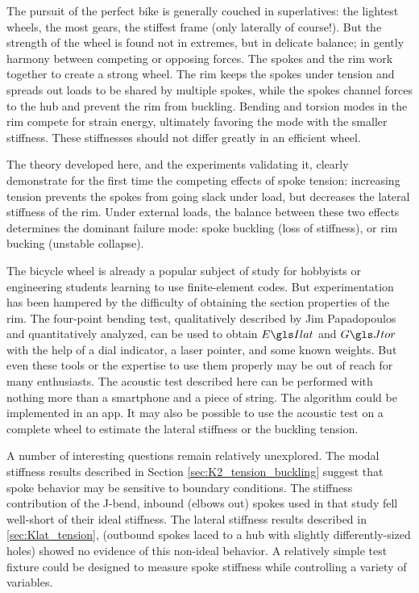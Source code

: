 \documentclass[\rootdir/thesis.tex]{subfiles}
\begin{document}

The pursuit of the perfect bike is generally couched in superlatives: the lightest wheels, the most gears, the stiffest frame (only laterally of course!). But the strength of the wheel is found not in extremes, but in delicate balance; in gently harmony between competing or opposing forces. The spokes and the rim work together to create a strong wheel. The rim keeps the spokes under tension and spreads out loads to be shared by multiple spokes, while the spokes channel forces to the hub and prevent the rim from buckling. Bending and torsion modes in the rim compete for strain energy, ultimately favoring the mode with the smaller stiffness. These stiffnesses should not differ greatly in an efficient wheel.

The theory developed here, and the experiments validating it, clearly demonstrate for the first time the competing effects of spoke tension: increasing tension prevents the spokes from going slack under load, but decreases the lateral stiffness of the rim. Under external loads, the balance between these two effects determines the dominant failure mode: spoke buckling (loss of stiffness), or rim bucking (unstable collapse).

The bicycle wheel is already a popular subject of study for hobbyists or engineering students learning to use finite-element codes. But experimentation has been hampered by the difficulty of obtaining the section properties of the rim. The four-point bending test, qualitatively described by Jim Papadopoulos and quantitatively analyzed, can be used to obtain $\EIl$ and $\GJ$ with the help of a dial indicator, a laser pointer, and some known weights. But even these tools or the expertise to use them properly may be out of reach for many enthusiasts. The acoustic test described here can be performed with nothing more than a smartphone and a piece of string. The algorithm could be implemented in an app. It may also be possible to use the acoustic test on a complete wheel to estimate the lateral stiffness or the buckling tension.

A number of interesting questions remain relatively unexplored. The modal stiffness results described in Section \ref{sec:K2_tension_buckling} suggest that spoke behavior may be sensitive to boundary conditions. The stiffness contribution of the J-bend, inbound (elbows out) spokes used in that study fell well-short of their ideal stiffness. The lateral stiffness results described in \ref{sec:Klat_tension}, (outbound spokes laced to a hub with slightly differently-sized holes) showed no evidence of this non-ideal behavior. A relatively simple test fixture could be designed to measure spoke stiffness while controlling a variety of variables.
\end{document}
